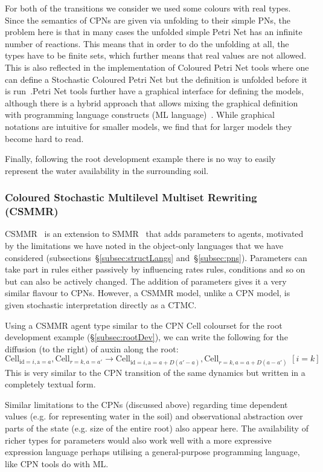 \documentclass[phd]{infthesis}
\newcommand{\eg}{e.g.\xspace}
\newcommand{\ssec}[1]{\S\ref{subsec:#1}}
\newcommand{\mr}[1]{\mathrm{#1}}
\begin{document}
For both of the transitions we consider we used some colours with $\mr{real}$
types. Since the semantics of CPNs are given via unfolding to their simple PNs,
the problem here is that in many cases the unfolded simple Petri Net has an
infinite number of reactions. This means that in order to do the unfolding at
all, the types have to be finite sets, which further means that real values are
not allowed. This is also reflected in the implementation of Coloured Petri Net
tools where one can define a Stochastic Coloured Petri Net but the definition is
unfolded before it is run~\citep{heiner_snoopyunifying_2012}.Petri Net tools
further have a graphical interface for defining the models, although there is a
hybrid approach that allows mixing the graphical definition with programming
language constructs (ML language)~\cite{jensen_coloured_1987}. While graphical
notations are intuitive for smaller models, we find that for larger models
they become hard to read.

Finally, following the root development example there is no way to easily
represent the water availability in the surrounding soil.

\subsubsection*{Coloured Stochastic Multilevel Multiset Rewriting (CSMMR)}
CSMMR~\citep{oury_coloured_2011} is an extension to
SMMR~\citep{oury_multi-level_2013} that adds parameters to agents, motivated by
the limitations we have noted in the object-only languages that we have
considered (subsections~\ssec{structLangs} and~\ssec{pns}). Parameters can take
part in rules either passively by influencing rates rules, conditions and so on
but can also be actively changed. The addition of parameters gives it a very
similar flavour to CPNs. However, a CSMMR model, unlike a CPN model, is given
stochastic interpretation directly as a CTMC.

Using a CSMMR agent type similar to the CPN $\mr{Cell}$ colourset for the root
development example (\ssec{rootDev}), we can write the following
for the diffusion (to the right) of auxin along the root:
$$
\mr{Cell}_{\mr{id}=i, \mr{a}=a}, \mr{Cell}_{r=k, a=a'} \xrightarrow{}
\mr{Cell}_{\mr{id}=i, \mr{a}=a+D(a'-a)}, \mr{Cell}_{r=k, a=a+D(a-a')} \, \,
[i=k]
$$
This is very similar to the CPN transition of the same dynamics but written in a
completely textual form.

Similar limitations to the CPNs (discussed above) regarding time dependent
values (\eg for representing water in the soil) and observational abstraction
over parts of the state (\eg size of the entire root) also appear here. The
availability of richer types for parameters would also work well with a more
expressive expression language perhaps utilising a general-purpose programming
language, like CPN tools do with ML.
\end{document}
